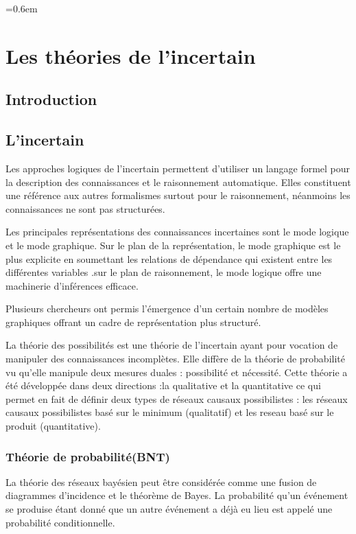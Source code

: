 \parskip=0.6em
\chapter{Les théories de l'incertain}

{}
\section*{Introduction}



\section{L’incertain}

Les approches logiques de l’incertain permettent d’utiliser un langage formel pour la description des connaissances et le raisonnement automatique. Elles constituent une référence aux autres formalismes surtout pour le raisonnement, néanmoins les connaissances ne  sont pas structurées.

Les principales représentations des connaissances incertaines sont le mode logique et le mode graphique.
Sur le plan de la représentation, le mode graphique est le plus explicite en soumettant les relations de dépendance qui existent entre les différentes variables .sur le plan de raisonnement, le mode logique offre une machinerie d’inférences efficace.

Plusieurs chercheurs ont permis l’émergence d’un certain nombre de modèles graphiques offrant un cadre de représentation plus structuré.

La théorie des possibilités est une théorie de l’incertain ayant pour vocation de manipuler des connaissances incomplètes. Elle diffère de la théorie de probabilité  vu qu'elle manipule deux mesures duales : possibilité et nécessité. Cette théorie a été développée dans deux directions :la qualitative et la quantitative ce qui permet en fait de définir deux types de réseaux causaux possibilistes : les réseaux causaux possibilistes basé sur le minimum (qualitatif) et les reseau basé sur le produit (quantitative).



\subsection{Théorie de probabilité(BNT)}

La théorie des réseaux bayésien peut être considérée comme une fusion de diagrammes d'incidence et le théorème de Bayes. La probabilité qu'un événement se produise étant donné que un autre événement a déjà eu lieu est appelé une probabilité conditionnelle. 

